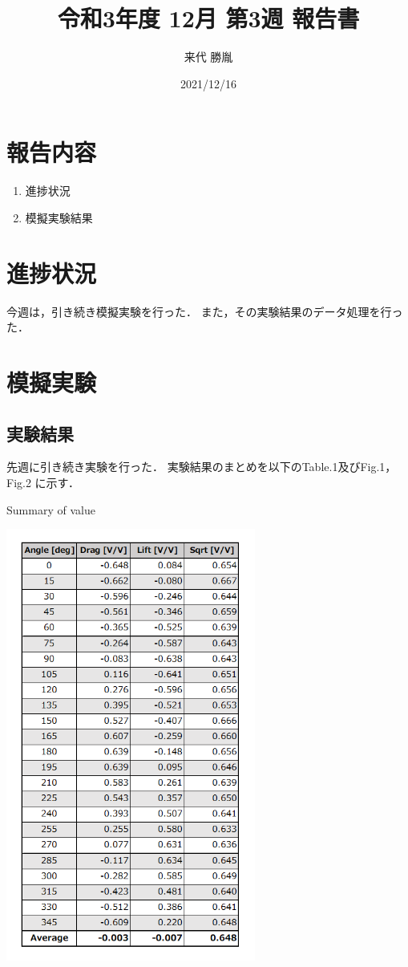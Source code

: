 \documentclass[twocolumn,a4j]{jsarticle}
\author{来代 勝胤}
\title{令和3年度 12月 第3週 報告書}
\date{2021/12/16}
\begin{document}
\columnseprule=0.1mm

\maketitle
\section*{報告内容}
\begin{enumerate}[1.]
    \item 進捗状況
    \item 模擬実験結果
\end{enumerate}

\section{進捗状況}
今週は，引き続き模擬実験を行った．
また，その実験結果のデータ処理を行った．

\section{模擬実験}

\subsection{実験結果}

先週に引き続き実験を行った．
実験結果のまとめを以下のTable.1及びFig.1，Fig.2 に示す．

\begin{table}[htbp]
    \begin{center}
        \caption{Summary of value}
        \includegraphics[width=82mm]{../images/table_1.png}
    \end{center}
\end{table}
\end{document}
